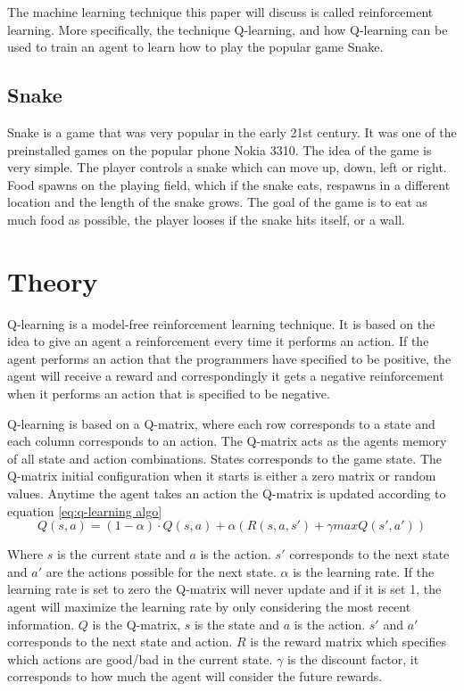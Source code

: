 \documentclass[fleqn,10pt]{SelfArx} %
\begin{document}
The machine learning technique this paper will discuss is called reinforcement learning. More specifically, the technique Q-learning, and how Q-learning can be used to train an agent to learn how to play the popular game Snake. 

\subsection{Snake}
Snake is a game that was very popular in the early 21st century. It was one of the preinstalled games on the popular phone Nokia 3310. The idea of the game is very simple. The player controls a snake which can move up, down, left or right. Food spawns on the playing field, which if the snake eats, respawns in a different location and the length of the snake grows. The goal of the game is to eat as much food as possible, the player looses if the snake hits itself, or a wall.

\section{Theory}
Q-learning is a model-free reinforcement learning technique. It is based on the idea to give an agent a reinforcement every time it performs an action. If the agent performs an action that the programmers have specified to be positive, the agent will receive a reward and correspondingly it gets a negative reinforcement when it performs an action that is specified to be negative. 

Q-learning is based on a Q-matrix, where each row corresponds to a state and each column corresponds to an action. The Q-matrix acts as the agents memory of all state and action combinations. States corresponds to the game state. The Q-matrix initial configuration when it starts is either a zero matrix or random values. Anytime the agent takes an action the Q-matrix is updated according to equation \ref{eq:q-learning algo}
\begin{equation}
\label{eq:q-learning algo}
Q(s,a) = (1 - \alpha) \cdot Q(s,a) + \alpha (R(s,a,s') + \gamma maxQ(s',a'))
\end{equation}

Where $s$ is the current state and $a$ is the action. $s'$ corresponds to the next state and $a'$ are the actions possible for the next state. $\alpha$ is the learning rate. If the learning rate is set to zero the Q-matrix will never update and if it is set 1, the agent will maximize the learning rate by only considering the most recent information. $Q$ is the Q-matrix, $s$ is the state and $a$ is the action. $s'$ and $a'$ corresponds to the next state and action. $R$ is the reward matrix which specifies which actions are good/bad in the current state. $\gamma$ is the discount factor, it corresponds to how much the agent will consider the future rewards. \cite{Q-learning-OG} 
\end{document}
